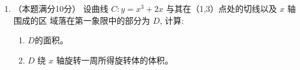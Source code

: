 \begin{enumerate}
{	\textbf{化简 Laplace 算子.} 对球对称函数
	$\Delta u=\frac{1}{\rho^{2}}\frac{\partial}{\partial\rho}\left(\rho^{2}\frac{\partial u}{\partial\rho}\right)$。
	由 $\frac{\partial u}{\partial\rho}=f^{\prime}(r)\frac{dr}{d\rho}=\frac{f^{\prime}(r)}{\rho}$
	得 $\rho^{2}u_\rho=\rho f^{\prime}(r)$，再对 $\rho$ 求导得
	$f^{\prime}(r)+\rho f^{\prime\prime}(r)\frac{1}{\rho}=f^{\prime}(r)+f^{\prime\prime}(r)$，故
	\[
	\Delta u=\frac{f^{\prime\prime}(r)+f^{\prime}(r)}{\rho^{2}}
	=\frac{f^{\prime\prime}(r)+f^{\prime}(r)}{e^{2r}} .
	\]

	\textbf{解常微分方程.} 题设右端 $\left(x^{2}+y^{2}+z^{2}\right)^{-3/2}=\rho^{-3}=e^{-3r}$，故
	\[
	f^{\prime\prime}(r)+f^{\prime}(r)=e^{-r} .
	\]
	特征方程 $\lambda^{2}+\lambda=0$ 的根为 $0$ 与 $-1$，齐次解为 $C_1+C_2e^{-r}$。
	因 $-1$ 是单根，设特解 $f^{*}=Are^{-r}$，代入左端得 $-Ae^{-r}$，故 $A=-1$。于是
	\[
	f(r)=C_1+C_2e^{-r}-re^{-r},
	\]
	把自变量改记为 $x$ 即 $f(x)=C_1+\left(C_2-x\right)e^{-x}$。

	\textbf{回代检验.} 此时 $u=C_1+\frac{C_2}{\rho}-\frac{\ln\rho}{\rho}$。
	直接计算 $\Delta\left(\frac1\rho\right)=0$，而
	\[
	\Delta\left(-\frac{\ln\rho}{\rho}\right)
	=g^{\prime\prime}(\rho)+\frac{2}{\rho}g^{\prime}(\rho)=\frac{1}{\rho^{3}},
	\qquad g(\rho)=-\frac{\ln\rho}{\rho},
	\]
	与题设方程右端一致。

	\par\vspace{1mm}\noindent
	\textbf{注：}{\kaishu
	原答案作 $f(x)=1+C_2e^{x}+\frac12\frac{1}{x^2+y^2+z^2}-\frac{1}{\sqrt{x^2+y^2+z^2}}$，
	有误：$f$ 是一元函数，右端不应出现 $x,y,z$；指数应为 $e^{-x}$；
	而 $\frac{1}{2\rho^{2}}$ 一项并不调和，也不是所需的特解。
	}\par
}


\item 
（本题满分10分）
设曲线 $C: y=x^{3}+2 x$ 与其在（1,3）点处的切线以及 $x$ 轴围成的区 域落在第一象限中的部分为 $D$, 计算:
\begin{enumerate}
	\item
$  D  $的面积。
\item 
$D$ 绕 $x$ 轴旋转一周所得旋转体的体积。
\end{enumerate}


\end{enumerate}
